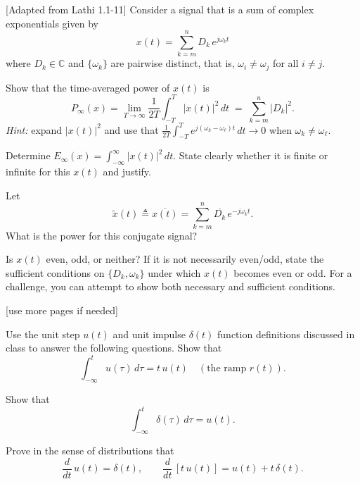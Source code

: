 \documentclass{ee102_pset}
\author{\rule{3cm}{0.4pt}} %
\begin{document}
[Adapted from Lathi 1.1-11] Consider a signal that is a sum of complex exponentials given by
\[
x(t)=\sum_{k=m}^{n} D_k\,e^{j\omega_k t}\!
\]
where $D_k\in\mathbb{C}$ and $\{\omega_k\}$ are pairwise distinct, that is, $\omega_i \neq \omega_j$ for all $i \neq j$.

\problempart{[10 points]} Show that the time-averaged power of $x(t)$ is
  \[
  P_\infty(x)=\lim_{T\to\infty}\frac{1}{2T}\int_{-T}^{T}|x(t)|^2\,dt
  \;=\;\sum_{k=m}^{n}|D_k|^2.
  \]
  \emph{Hint:} expand $|x(t)|^2$ and use that $\frac{1}{2T}\!\int_{-T}^{T}\!e^{j(\omega_k-\omega_\ell)t}\,dt\to 0$ when $\omega_k\neq\omega_\ell$.

\problempart{[5 points]} Determine $E_\infty(x)=\int_{-\infty}^{\infty}|x(t)|^2\,dt$. State clearly whether it is finite or infinite for this $x(t)$ and justify.

\problempart{[5 points]} Let
  \[
  \tilde{x}(t)\triangleq \overline{x(t)}=\sum_{k=m}^{n}\overline{D_k}\,e^{-j\omega_k t}.
  \] What is the power for this conjugate signal?

\problempart{[5 points]} Is $x(t)$ even, odd, or neither? If it is not necessarily even/odd, state the sufficient conditions on $\{D_k,\omega_k\}$ under which $x(t)$ becomes even or odd. For a challenge, you can attempt to show both necessary and sufficient conditions.
\vspace*{\fill}
\begin{center}
[use more pages if needed]
\end{center}


 Use the unit step $u(t)$ and unit impulse $\delta(t)$ function definitions discussed in class to answer the following questions.
\problempart{[5 points]} Show that
  \[
  \int_{-\infty}^{t} u(\tau)\,d\tau = t\,u(t) \quad (\text{the ramp } r(t)).
  \]

\problempart{[5 points]} Show that
  \[
  \int_{-\infty}^{t}\delta(\tau)\,d\tau = u(t).
  \]

\problempart{[10 points]} Prove in the sense of distributions that
  \[
  \frac{d}{dt}\,u(t)=\delta(t),\qquad \frac{d}{dt}\,[t\,u(t)] = u(t) + t\,\delta(t).
  \]

\end{document}
